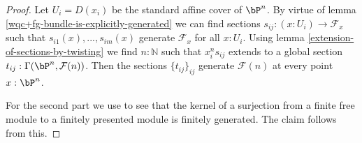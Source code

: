 \begin{proof}
  Let $U_i = D(x_i)$ be the standard affine cover of $\bP^n$.
  By virtue of lemma \ref{wqc+fg-bundle-is-explicitly-generated} we can find sections $s_{ij} : (x:U_i) \to \mathcal F_x$ such that $s_{i1}(x), ..., s_{im}(x)$ generate $\mathcal F_x$ for all $x:U_i$.
  Using lemma \ref{extension-of-sections-by-twisting} we find $n:\mathbb{N}$ such that $x_i^ns_{ij}$ extends to a global section $t_{ij}:\Gamma (\bP^n,\mathcal F(n))$.
  Then the sections $\{t_{ij}\}_{ij}$ generate $\mathcal F(n)$ at every point $x:\bP^n$.

  For the second part we use \cite[Chapter IV, 1.0 Lemma]{lombardi-quitte} to see that the kernel of a surjection from a finite free module to a finitely presented module is finitely generated.
  The claim follows from this.
\end{proof}

